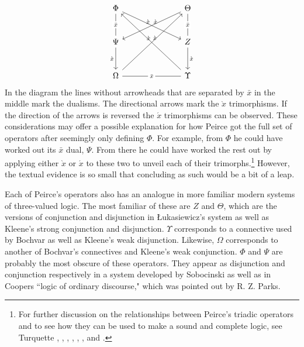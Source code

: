 \documentclass[12pt]{article}
\begin{document}
$$
\begin{tikzcd}[row sep=large,column sep=large]
\Phi \arrow[d, "\bar{x}" description, no head] \arrow[rrd, "\grave{x}"]     &  & \Theta \arrow[d, "\bar{x}" description, no head] \arrow[lld, "\grave{x}"'] \\
\Psi \arrow[d, "\grave{x}"']                                                &  & Z \arrow[d, "\grave{x}"]                                                   \\
\Omega \arrow[rr, "\bar{x}" description, no head] \arrow[rruu, "\grave{x}"] &  & \Upsilon \arrow[lluu, "\grave{x}"']                                       
\end{tikzcd}
$$
In the diagram the lines without arrowheads that are separated by $\bar{x}$ in the middle mark the dualisms. The directional arrows mark the $\grave{x}$ trimorphisms. If the direction of the arrows is reversed the $\acute{x}$ trimorphisms can be observed. These considerations may offer a possible explanation for how Peirce got the full set of operators after seemingly only defining $\Phi$. For example, from $\Phi$ he could have worked out its $\bar{x}$ dual, $\Psi$. From there he could have worked the rest out by applying either $\grave{x}$ or $\acute{x}$ to these two to unveil each of their trimorphs.\footnote{For further discussion on the relationships between Peirce's triadic operators and to see how they can be used to make a sound and complete logic, see Turquette \citeyear{Turquette1968-TURSMA}, \citeyear{Turquette1967-TURPPA-3}, \citeyear{Turquette1969-TURPCS}, \citeyear{Turquette1976-TURMAF}, \citeyear{Turquette1978-TURAAF-2}, \citeyear{Turquette1981-TURQFP}, and \citeyear{turquette1988defining}.} However, the textual evidence is so small that concluding as such would be a bit of a leap.

Each of Peirce's operators also has an analogue in more familiar modern systems of three-valued logic. The most familiar of these are $Z$ and $\Theta$, which are the versions of conjunction and disjunction in Łukasiewicz's system as well as Kleene's strong conjunction and disjunction. $\Upsilon$ corresponds to a connective used by Bochvar as well as Kleene's weak disjunction. Likewise, $\Omega$ corresponds to another of Bochvar's connectives and Kleene's weak conjunction. $\Phi$ and $\Psi$ are probably the most obscure of these operators. They appear as disjunction and conjunction respectively in a system developed by Sobocinski as well as in Coopers ``logic of ordinary discourse," which was pointed out by R. Z. Parks.
\end{document}
